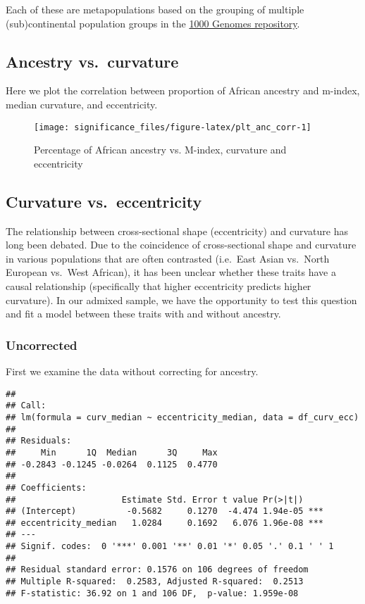 \documentclass[
]{article}
\begin{document}
Each of these are metapopulations based on the grouping of multiple
(sub)continental population groups in the
\href{https://www.internationalgenome.org/category/population/}{1000
Genomes repository}.

\hypertarget{ancestry-vs.-curvature}{%
\subsection{Ancestry vs.~curvature}\label{ancestry-vs.-curvature}}

Here we plot the correlation between proportion of African ancestry and
m-index, median curvature, and eccentricity.

\begin{figure}
\texttt{[image: significance\_files/figure-latex/plt\_anc\_corr-1]} \caption{Percentage of African ancestry vs. M-index, curvature and eccentricity}\label{fig:plt_anc_corr}
\end{figure}

\hypertarget{curvature-vs.-eccentricity}{%
\subsection{Curvature
vs.~eccentricity}\label{curvature-vs.-eccentricity}}

The relationship between cross-sectional shape (eccentricity) and
curvature has long been debated. Due to the coincidence of
cross-sectional shape and curvature in various populations that are
often contrasted (i.e.~East Asian vs.~North European vs.~West African),
it has been unclear whether these traits have a causal relationship
(specifically that higher eccentricity predicts higher curvature). In
our admixed sample, we have the opportunity to test this question and
fit a model between these traits with and without ancestry.

\hypertarget{uncorrected}{%
\subsubsection{Uncorrected}\label{uncorrected}}

First we examine the data without correcting for ancestry.

\begin{verbatim}
## 
## Call:
## lm(formula = curv_median ~ eccentricity_median, data = df_curv_ecc)
## 
## Residuals:
##     Min      1Q  Median      3Q     Max 
## -0.2843 -0.1245 -0.0264  0.1125  0.4770 
## 
## Coefficients:
##                     Estimate Std. Error t value Pr(>|t|)    
## (Intercept)          -0.5682     0.1270  -4.474 1.94e-05 ***
## eccentricity_median   1.0284     0.1692   6.076 1.96e-08 ***
## ---
## Signif. codes:  0 '***' 0.001 '**' 0.01 '*' 0.05 '.' 0.1 ' ' 1
## 
## Residual standard error: 0.1576 on 106 degrees of freedom
## Multiple R-squared:  0.2583, Adjusted R-squared:  0.2513 
## F-statistic: 36.92 on 1 and 106 DF,  p-value: 1.959e-08
\end{verbatim}
\end{document}

